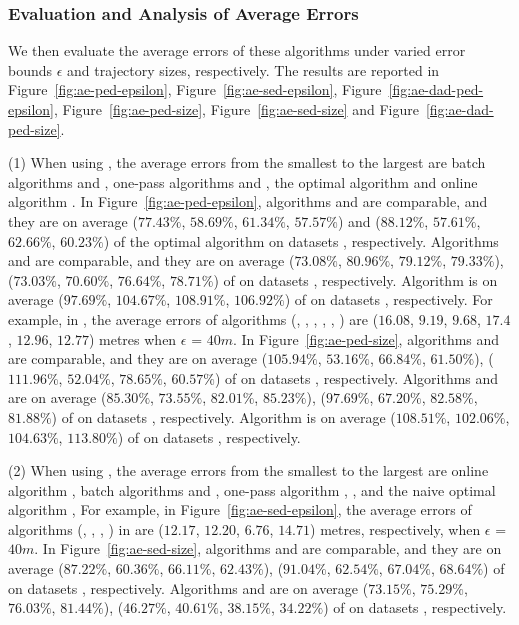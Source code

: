 \subsubsection{Evaluation and Analysis of Average Errors}
We then evaluate the average errors of these algorithms under varied error bounds $\epsilon$ and trajectory sizes, respectively.
The results are reported in Figure~\ref{fig:ae-ped-epsilon}, Figure~\ref{fig:ae-sed-epsilon}, Figure~\ref{fig:ae-dad-ped-epsilon}, Figure~\ref{fig:ae-ped-size}, Figure~\ref{fig:ae-sed-size} and Figure~\ref{fig:ae-dad-ped-size}.


\sstab (1) When using \ped, the average errors from the smallest
to the largest are batch algorithms \tpa and \dpa, one-pass
algorithms \siped and \operb, the optimal algorithm \opt and online algorithm \bqsa.
%
In Figure~\ref{fig:ae-ped-epsilon}, algorithms \tpa and \dpa are comparable, and they are on average ($77.43\%$, $58.69\%$, $61.34\%$,
$57.57\%$) and ($88.12\%$, $57.61\%$, $62.66\%$, $60.23\%$) of the optimal algorithm \opt on datasets \dSets, respectively.
Algorithms \siped and \operb are comparable, and they are on average
($73.08\%$, $80.96\%$, $79.12\%$, $79.33\%$), ($73.03\%$, $70.60\%$, $76.64\%$, $78.71\%$) of \opt on datasets \dSets, respectively.
Algorithm \bqsa is on average ($97.69\%$, $104.67\%$, $108.91\%$, $106.92\%$) of \opt on datasets \dSets, respectively.
For example, in \mopsi, the average errors of algorithms
(\opt, \tpa, \dpa, \bqsa, \siped, \operb ) are ($16.08$, $9.19$, $9.68$, $17.4$, $12.96$, $12.77$)  metres when $\epsilon$ = $40m$.
%
In Figure~\ref{fig:ae-ped-size}, algorithms \tpa and \dpa are comparable, and they are on average
{($105.94\%$, $53.16\%$, $66.84\%$, $61.50\%$), ($111.96\%$, $52.04\%$, $78.65\%$, $60.57\%$)} of \opt on datasets \dSets, respectively.
Algorithms \siped and \operb are on average {($85.30\%$, $73.55\%$, $82.01\%$,
  $85.23\%$), ($97.69\%$, $67.20\%$, $82.58\%$, $81.88\%$)}
of \opt on datasets \dSets, respectively.
Algorithm \bqsa is  on average  {($108.51\%$, $102.06\%$, $104.63\%$, $113.80\%$)}
of \opt on datasets \dSets, respectively.


\sstab (2) When using \sed, the average errors from the smallest
to the largest are online algorithm \squishe, batch algorithms \tpa and \dpa,
one-pass algorithm \cised, , and the naive optimal algorithm \opt,
%
For example, in Figure~\ref{fig:ae-sed-epsilon}, the average errors of algorithms
(\tpa, \dpa, \squishe, \cised) in \mopsi are ($12.17$, $12.20$, $6.76$, $14.71$) metres, respectively, when $\epsilon$ = $40m$.
%
In Figure~\ref{fig:ae-sed-size}, algorithms \tpa and \dpa are comparable, and they are on average
{($87.22\%$, $60.36\%$, $66.11\%$, $62.43\%$), ($91.04\%$, $62.54\%$, $67.04\%$, $68.64\%$)} of \opt on datasets \dSets, respectively.
Algorithms \cised and \squishe are on average {($73.15\%$, $75.29\%$, $76.03\%$, $81.44\%$), ($46.27\%$, $40.61\%$, $38.15\%$, $34.22\%$)} of \opt on datasets \dSets, respectively.


